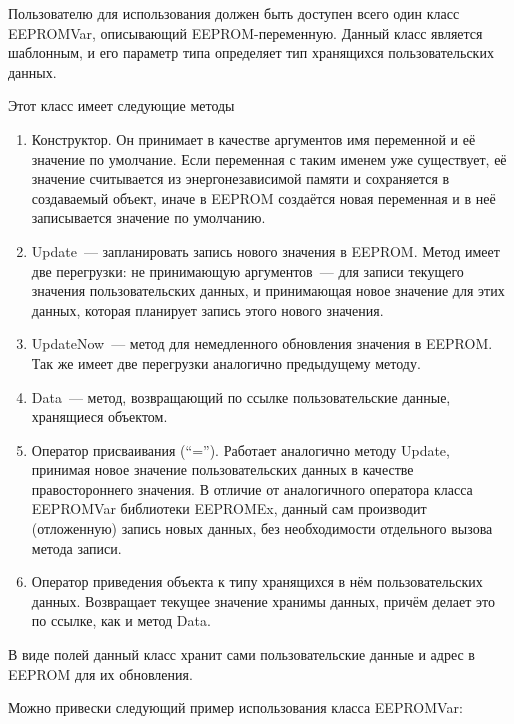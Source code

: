 Пользователю для использования должен быть доступен всего один класс EEPROMVar, описывающий EEPROM-переменную.
Данный класс является шаблонным, и его параметр типа определяет тип хранящихся пользовательских данных.


Этот класс имеет следующие методы
\begin{enumerate}
	\item Конструктор. Он принимает в качестве аргументов имя переменной и её значение по умолчание.
	Если переменная с таким именем уже существует, её значение считывается из энергонезависимой памяти и сохраняется в создаваемый объект, иначе в EEPROM создаётся новая переменная и в неё записывается значение по умолчанию.
	\item Update~--- запланировать запись нового значения в EEPROM.
	Метод имеет две перегрузки: не принимающую аргументов~--- для записи текущего значения пользовательских данных, и принимающая новое значение для этих данных, которая планирует запись этого нового значения.
	\item UpdateNow~--- метод для немедленного обновления значения в EEPROM.
	Так же имеет две перегрузки аналогично предыдущему методу.
	\item Data~--- метод, возвращающий по ссылке пользовательские данные, хранящиеся объектом.
	\item Оператор присваивания ("`="').
	Работает аналогично методу Update, принимая новое значение пользовательских данных в качестве правостороннего значения.
	В отличие от аналогичного оператора класса EEPROMVar библиотеки EEPROMEx, данный сам производит (отложенную) запись новых данных, без необходимости отдельного вызова метода записи.
	\item Оператор приведения объекта к типу хранящихся в нём пользовательских данных.
	Возвращает текущее значение хранимы данных, причём делает это по ссылке, как и метод Data.
\end{enumerate}

В виде полей данный класс хранит сами пользовательские данные и адрес в EEPROM для их обновления.

Можно привески следующий пример использования класса EEPROMVar:




